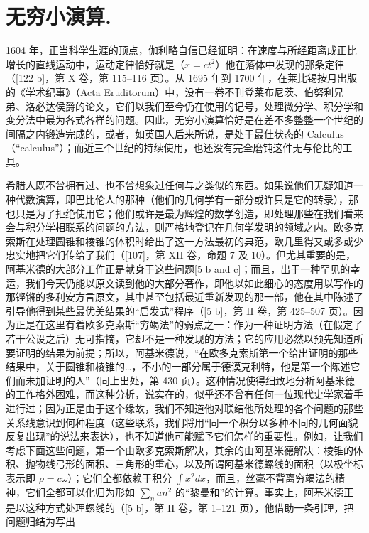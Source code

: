 \chapter{无穷小演算.}

1604 年，正当科学生涯的顶点，伽利略自信已经证明：在速度与所经距离成正比增长的直线运动中，运动定律恰好就是（\(x = ct^{2}\)）他在落体中发现的那条定律（{[}122 b{]}，第 X 卷，第 115–116 页）。从 1695 年到 1700 年，在莱比锡按月出版的《学术纪事》（Acta Eruditorum）中，没有一卷不刊登莱布尼茨、伯努利兄弟、洛必达侯爵的论文，它们以我们至今仍在使用的记号，处理微分学、积分学和变分法中最为各式各样的问题。因此，无穷小演算恰好是在差不多整整一个世纪的间隔之内锻造完成的，或者，如英国人后来所说，是处于最佳状态的 Calculus（“calculus”）；而近三个世纪的持续使用，也还没有完全磨钝这件无与伦比的工具。

希腊人既不曾拥有过、也不曾想象过任何与之类似的东西。如果说他们无疑知道一种代数演算，即巴比伦人的那种（他们的几何学有一部分或许只是它的转录），那也只是为了拒绝使用它；他们或许是最为辉煌的数学创造，即处理那些在我们看来会与积分学相联系的问题的方法，则严格地登记在几何学发明的领域之内。欧多克索斯在处理圆锥和棱锥的体积时给出了这一方法最初的典范，欧几里得又或多或少忠实地把它们传给了我们（{[}107{]}，第 XII 卷，命题 7 及 10）。但尤其重要的是，阿基米德的大部分工作正是献身于这些问题{[}5 b and c{]}；而且，出于一种罕见的幸运，我们今天仍能以原文读到他的大部分著作，即他以如此细心的态度用以写作的那铿锵的多利安方言原文，其中甚至包括最近重新发现的那一部，他在其中陈述了引导他得到某些最优美结果的“启发式”程序（{[}5 b{]}，第 II 卷，第 425–507 页）。因为正是在这里有着欧多克索斯“穷竭法”的弱点之一：作为一种证明方法（在假定了若干公设之后）无可指摘，它却不是一种发现的方法；它的应用必然以预先知道所要证明的结果为前提；所以，阿基米德说，“在欧多克索斯第一个给出证明的那些结果中，关于圆锥和棱锥的\ldots，不小的一部分属于德谟克利特，他是第一个陈述它们而未加证明的人”（同上出处，第 430 页）。这种情况使得细致地分析阿基米德的工作格外困难，而这种分析，说实在的，似乎还不曾有任何一位现代史学家着手进行过；因为正是由于这个缘故，我们不知道他对联结他所处理的各个问题的那些关系线意识到何种程度（这些联系，我们将用“同一个积分以多种不同的几何面貌反复出现”的说法来表达），也不知道他可能赋予它们怎样的重要性。例如，让我们考虑下面这些问题，第一个由欧多克索斯解决，其余的由阿基米德解决：棱锥的体积、抛物线弓形的面积、三角形的重心，以及所谓阿基米德螺线的面积（以极坐标表示即 \(\rho = c\omega\)）；它们全都依赖于积分 \(\int x^2 dx\)，而且，丝毫不背离穷竭法的精神，它们全都可以化归为形如 \(\sum_n an^2\) 的“黎曼和”的计算。事实上，阿基米德正是以这种方式处理螺线的（{[}5 b{]}，第 II 卷，第 1–121 页），他借助一条引理，把问题归结为写出

